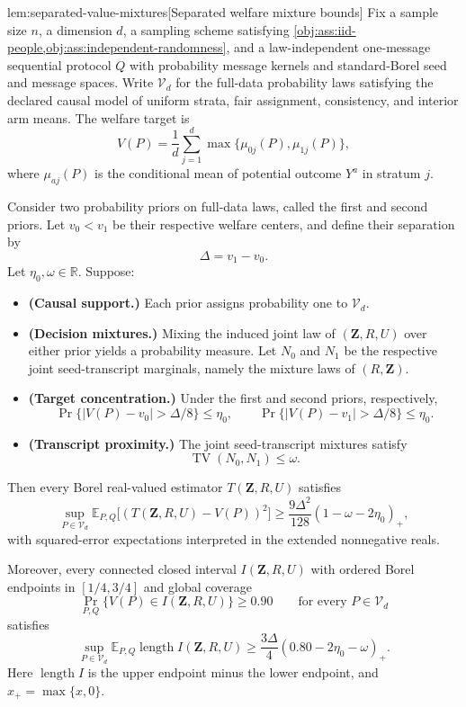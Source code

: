 \begin{lemmav}{lem:separated-value-mixtures}[Separated welfare mixture bounds]
Fix a sample size \(n\), a dimension \(d\), a sampling scheme satisfying \cref{obj:ass:iid-people,obj:ass:independent-randomness}, and a law-independent one-message sequential protocol \(Q\) with probability message kernels and standard-Borel seed and message spaces. Write \(\mathcal V_d\) for the full-data probability laws satisfying the declared causal model of uniform strata, fair assignment, consistency, and interior arm means. The welfare target is
\[
V(P)=\frac{1}{d}\sum_{j=1}^{d}
\max\{\mu_{0j}(P),\mu_{1j}(P)\},
\]
where \(\mu_{aj}(P)\) is the conditional mean of potential outcome \(Y^a\) in stratum \(j\).

Consider two probability priors on full-data laws, called the first and second priors. Let \(v_0<v_1\) be their respective welfare centers, and define their separation by
\[
\Delta=v_1-v_0.
\]
Let \(\eta_0,\omega\in\mathbb R\). Suppose:
\begin{itemize}
\item \textbf{(Causal support.)} Each prior assigns probability one to \(\mathcal V_d\).
\item \textbf{(Decision mixtures.)} Mixing the induced joint law of \((\mathbf Z,R,U)\) over either prior yields a probability measure. Let \(N_0\) and \(N_1\) be the respective joint seed-transcript marginals, namely the mixture laws of \((R,\mathbf Z)\).
\item \textbf{(Target concentration.)} Under the first and second priors, respectively,
\[
\Pr\{|V(P)-v_0|>\Delta/8\}\le\eta_0,
\qquad
\Pr\{|V(P)-v_1|>\Delta/8\}\le\eta_0.
\]
\item \textbf{(Transcript proximity.)} The joint seed-transcript mixtures satisfy
\[
\operatorname{TV}(N_0,N_1)\le\omega.
\]
\end{itemize}

Then every Borel real-valued estimator \(T(\mathbf Z,R,U)\) satisfies
\[
\sup_{P\in\mathcal V_d}
\mathbb E_{P,Q}\bigl[(T(\mathbf Z,R,U)-V(P))^2\bigr]
\ge
\frac{9\Delta^2}{128}(1-\omega-2\eta_0)_+,
\]
with squared-error expectations interpreted in the extended nonnegative reals.

Moreover, every connected closed interval \(I(\mathbf Z,R,U)\) with ordered Borel endpoints in \([1/4,3/4]\) and global coverage
\[
\Pr_{P,Q}\{V(P)\in I(\mathbf Z,R,U)\}\ge0.90
\qquad\text{for every }P\in\mathcal V_d
\]
satisfies
\[
\sup_{P\in\mathcal V_d}
\mathbb E_{P,Q}\operatorname{length}I(\mathbf Z,R,U)
\ge
\frac{3\Delta}{4}(0.80-2\eta_0-\omega)_+.
\]
Here \(\operatorname{length}I\) is the upper endpoint minus the lower endpoint, and \(x_+=\max\{x,0\}\).
\end{lemmav}

